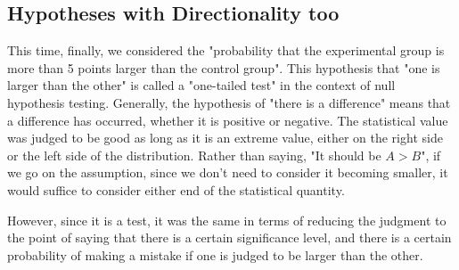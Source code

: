 \documentclass{ltjsbook}
\begin{document}
{\subsection{Hypotheses with Directionality too}
This time, finally, we considered the "probability that the experimental group is more than 5 points larger than the control group". This hypothesis that "one is larger than the other" is called a "one-tailed test" in the context of null hypothesis testing.
Generally, the hypothesis of "there is a difference" means that a difference has occurred, whether it is positive or negative. The statistical value was judged to be good as long as it is an extreme value, either on the right side or the left side of the distribution.
Rather than saying, "It should be $A > B$", if we go on the assumption, since we don't need to consider it becoming smaller, it would suffice to consider either end of the statistical quantity.

However, since it is a test, it was the same in terms of reducing the judgment to the point of saying that there is a certain significance level, and there is a certain probability of making a mistake if one is judged to be larger than the other.

}
\end{document}
